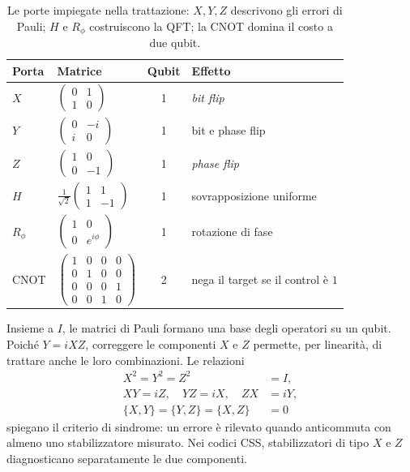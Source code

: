 \begin{onehalfspace}
\begin{table}[H]
\centering
\small
\begin{tabular}{llc l}
\toprule
\textbf{Porta} & \textbf{Matrice} & \textbf{Qubit} & \textbf{Effetto} \\
\midrule
$X$ & $\begin{pmatrix}0&1\\1&0\end{pmatrix}$ & 1 & \textit{bit flip} \\[7pt]
$Y$ & $\begin{pmatrix}0&-i\\i&0\end{pmatrix}$ & 1 & bit e phase flip \\[7pt]
$Z$ & $\begin{pmatrix}1&0\\0&-1\end{pmatrix}$ & 1 & \textit{phase flip} \\[7pt]
$H$ & $\tfrac{1}{\sqrt2}\begin{pmatrix}1&1\\1&-1\end{pmatrix}$ & 1 & sovrapposizione uniforme \\[7pt]
$R_\phi$ & $\begin{pmatrix}1&0\\0&e^{i\phi}\end{pmatrix}$ & 1 & rotazione di fase \\[7pt]
CNOT & $\begin{pmatrix}1&0&0&0\\0&1&0&0\\0&0&0&1\\0&0&1&0\end{pmatrix}$ & 2 & nega il target se il control \`e $1$ \\
\bottomrule
\end{tabular}
\caption[Le porte quantistiche essenziali]{Le porte impiegate nella trattazione:
$X,Y,Z$ descrivono gli errori di Pauli; $H$ e $R_\phi$ costruiscono la \ac{QFT};
la CNOT domina il costo a due qubit.}
\label{tab:porte_essenziali}
\end{table}

Insieme a $I$, le matrici di Pauli formano una base degli operatori su un
qubit. Poich\'e $Y=iXZ$, correggere le componenti $X$ e $Z$ permette, per
linearit\`a, di trattare anche le loro combinazioni. Le relazioni
\begin{equation}
\begin{aligned}
    X^2=Y^2=Z^2&=I,\\
    XY=iZ,\quad YZ=iX,\quad ZX&=iY,\\
    \{X,Y\}=\{Y,Z\}=\{X,Z\}&=0
\end{aligned}
\label{eq:algebra_pauli}
\end{equation}
spiegano il criterio di sindrome: un errore \`e rilevato quando anticommuta con
almeno uno stabilizzatore misurato. Nei codici \ac{CSS}, stabilizzatori di tipo
$X$ e $Z$ diagnosticano separatamente le due componenti.


\end{onehalfspace}
